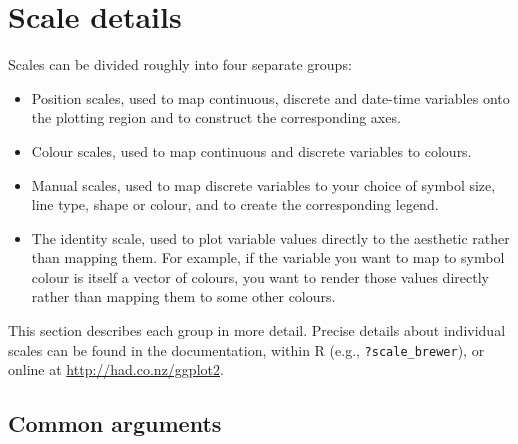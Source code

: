 % 

\section{Scale details}
\label{sec:scale-details}

Scales can be divided roughly into four separate groups:

\begin{itemize}
  \item Position scales, used to map continuous, discrete and date-time variables onto the plotting region and to construct the corresponding axes.

  \item Colour scales, used to map continuous and discrete variables to colours.

  \item Manual scales, used to map discrete variables to your choice of symbol size, line type, shape or colour, and to create the corresponding legend.

  \item The identity scale, used to plot variable values directly to the aesthetic rather than mapping them.  For example, if the variable you want to map to symbol colour is itself a vector of colours, you want to render those values directly rather than mapping them to some other colours.

\end{itemize}

\noindent  This section describes each group in more detail.  Precise details about individual scales can be found in the documentation, within R (e.g., {\tt ?scale\_brewer}), or online at  \url{http://had.co.nz/ggplot2}.  

\subsection{Common arguments}
\label{sub:scale-arguments}

